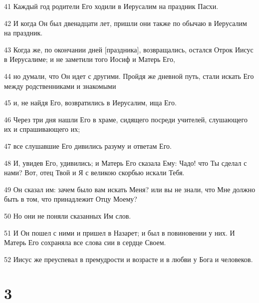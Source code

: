 \par 41 Каждый год родители Его ходили в Иерусалим на праздник Пасхи.
\par 42 И когда Он был двенадцати лет, пришли они также по обычаю в Иерусалим на праздник.
\par 43 Когда же, по окончании дней [праздника], возвращались, остался Отрок Иисус в Иерусалиме; и не заметили того Иосиф и Матерь Его,
\par 44 но думали, что Он идет с другими. Пройдя же дневной путь, стали искать Его между родственниками и знакомыми
\par 45 и, не найдя Его, возвратились в Иерусалим, ища Его.
\par 46 Через три дня нашли Его в храме, сидящего посреди учителей, слушающего их и спрашивающего их;
\par 47 все слушавшие Его дивились разуму и ответам Его.
\par 48 И, увидев Его, удивились; и Матерь Его сказала Ему: Чадо! что Ты сделал с нами? Вот, отец Твой и Я с великою скорбью искали Тебя.
\par 49 Он сказал им: зачем было вам искать Меня? или вы не знали, что Мне должно быть в том, что принадлежит Отцу Моему?
\par 50 Но они не поняли сказанных Им слов.
\par 51 И Он пошел с ними и пришел в Назарет; и был в повиновении у них. И Матерь Его сохраняла все слова сии в сердце Своем.
\par 52 Иисус же преуспевал в премудрости и возрасте и в любви у Бога и человеков.

\chapter{3}

